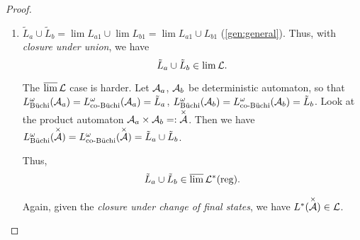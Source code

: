 \begin{lemma}
\begin{proof}
\begin{enumerate}
\item
$\tilde L_a \cup \tilde L_b = \lim L_{a1} \cup \lim L_{b1} = \lim L_{a1} \cup L_{b1}$ (\ref{gen:general}). Thus, with \emph{closure under union}, we have
\[ \tilde L_a \cup \tilde L_b \in \lim \mathcal{L} . \]

The $\operatorname{\overline{lim}}\mathcal{L}$ case is harder.
Let $\mathcal{A}_a$, $\mathcal{A}_b$ be deterministic automaton, so that $L^\omega_{\text{Büchi}}(\mathcal{A}_a) = L^\omega_{\text{co-Büchi}}(\mathcal{A}_a) = \tilde L_a$, $L^\omega_{\text{Büchi}}(\mathcal{A}_b) = L^\omega_{\text{co-Büchi}}(\mathcal{A}_b) = \tilde L_b$. Look at the product automaton $\mathcal{A}_a \times \mathcal{A}_b =: \overset{\times}{\mathcal{A}}$. Then we have $L^\omega_{\text{Büchi}}(\overset{\times}{\mathcal{A}}) = L^\omega_{\text{co-Büchi}}(\overset{\times}{\mathcal{A}}) = \tilde L_a \cup \tilde L_b$.

Thus,
\[ \tilde L_a \cup \tilde L_b \in \operatorname{\overline{lim}} \mathcal{L}^*(\text{reg}) . \]

Again, given the \emph{closure under change of final states}, we have $L^*(\overset{\times}{\mathcal{A}}) \in \mathcal{L}$.
\end{enumerate}
\end{proof}
\end{lemma}


